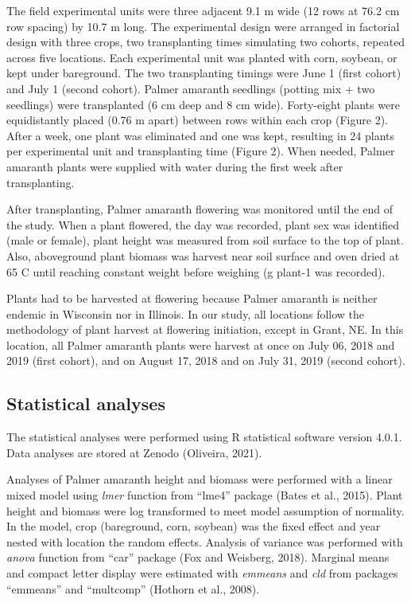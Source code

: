 \documentclass[utf8]{frontiersSCNS}
\begin{document}
The field experimental units were three adjacent 9.1 m wide (12 rows at
76.2 cm row spacing) by 10.7 m long. The experimental design were
arranged in factorial design with three crops, two transplanting times
simulating two cohorts, repeated across five locations. Each
experimental unit was planted with corn, soybean, or kept under
bareground. The two transplanting timings were June 1 (first cohort) and
July 1 (second cohort). Palmer amaranth seedlings (potting mix + two
seedlings) were transplanted (6 cm deep and 8 cm wide). Forty-eight
plants were equidistantly placed (0.76 m apart) between rows within each
crop (Figure 2). After a week, one plant was eliminated and one was
kept, resulting in 24 plants per experimental unit and transplanting
time (Figure 2). When needed, Palmer amaranth plants were supplied with
water during the first week after transplanting.

After transplanting, Palmer amaranth flowering was monitored until the
end of the study. When a plant flowered, the day was recorded, plant sex
was identified (male or female), plant height was measured from soil
surface to the top of plant. Also, aboveground plant biomass was harvest
near soil surface and oven dried at 65 C until reaching constant weight
before weighing (g plant-1 was recorded).

Plants had to be harvested at flowering because Palmer amaranth is
neither endemic in Wisconsin nor in Illinois. In our study, all
locations follow the methodology of plant harvest at flowering
initiation, except in Grant, NE. In this location, all Palmer amaranth
plants were harvest at once on July 06, 2018 and 2019 (first cohort),
and on August 17, 2018 and on July 31, 2019 (second cohort).

\hypertarget{statistical-analyses}{%
\subsection*{Statistical analyses}\label{statistical-analyses}}

The statistical analyses were performed using R statistical software
version 4.0.1. Data analyses are stored at Zenodo (Oliveira, 2021).

Analyses of Palmer amaranth height and biomass were performed with a
linear mixed model using \emph{lmer} function from ``lme4'' package
(Bates et al., 2015). Plant height and biomass were log transformed to
meet model assumption of normality. In the model, crop (bareground,
corn, soybean) was the fixed effect and year nested with location the
random effects. Analysis of variance was performed with \emph{anova}
function from ``car'' package (Fox and Weisberg, 2018). Marginal means
and compact letter display were estimated with \emph{emmeans} and
\emph{cld} from packages ``emmeans'' and ``multcomp'' (Hothorn et al.,
2008).
\end{document}
